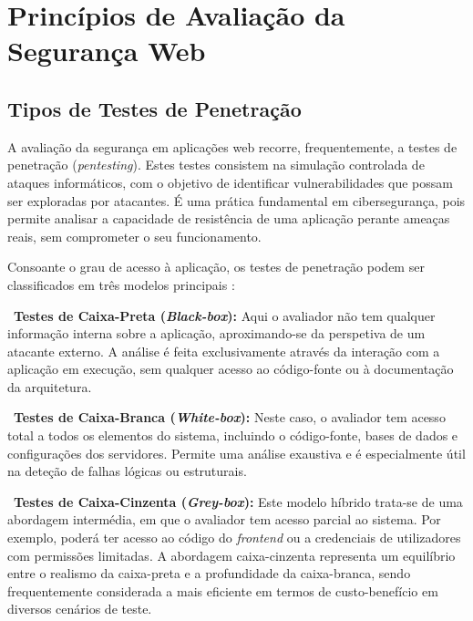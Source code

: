 \section{Princípios de Avaliação da Segurança Web}

\subsection{Tipos de Testes de Penetração}

A avaliação da segurança em aplicações web recorre, frequentemente, a testes de penetração (\textit{pentesting}). Estes testes consistem na simulação controlada de ataques informáticos, com o objetivo de identificar vulnerabilidades que possam ser exploradas por atacantes. É uma prática fundamental em cibersegurança, pois permite analisar a capacidade de resistência de uma aplicação perante ameaças reais, sem comprometer o seu funcionamento.

Consoante o grau de acesso à aplicação, os testes de penetração podem ser classificados em três modelos principais \cite{ref53}:

\begin{flushleft}
\textbullet\ \textbf{Testes de Caixa-Preta (\textit{Black-box}):} Aqui o avaliador não tem qualquer informação interna sobre a aplicação, aproximando-se da perspetiva de um atacante externo. A análise é feita exclusivamente através da interação com a aplicação em execução, sem qualquer acesso ao código-fonte ou à documentação da arquitetura.

\vspace{0.4cm}

\textbullet\ \textbf{Testes de Caixa-Branca (\textit{White-box}):} Neste caso, o avaliador tem acesso total a todos os elementos do sistema, incluindo o código-fonte, bases de dados e configurações dos servidores. Permite uma análise exaustiva e é especialmente útil na deteção de falhas lógicas ou estruturais.

\vspace{0.4cm}

\textbullet\ \textbf{Testes de Caixa-Cinzenta (\textit{Grey-box}):} Este modelo híbrido trata-se de uma abordagem intermédia, em que o avaliador tem acesso parcial ao sistema. Por exemplo, poderá ter acesso ao código do \textit{frontend} ou a credenciais de utilizadores com permissões limitadas. A abordagem caixa-cinzenta representa um equilíbrio entre o realismo da caixa-preta e a profundidade da caixa-branca, sendo frequentemente considerada a mais eficiente em termos de custo-benefício em diversos cenários de teste.
\end{flushleft}

